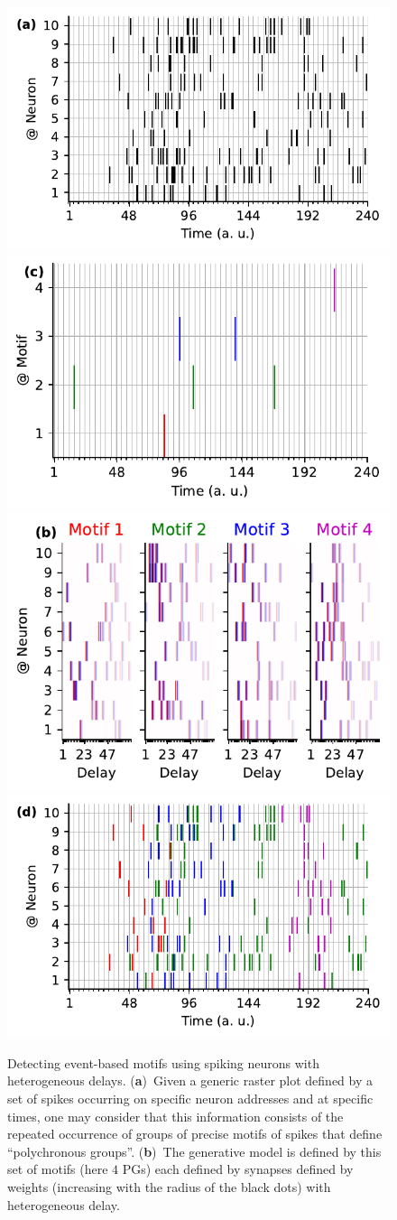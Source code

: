 \documentclass[brainsci, %
               review,accept,pdftex,moreauthors
               ]{Definitions/mdpi}
\begin{document}
\begin{figure}[H]%
    \includegraphics[width=0.490\linewidth]{figures/THC_1a_k.pdf}
    \includegraphics[width=0.490\linewidth]{figures/THC_1c.pdf}
    \includegraphics[width=0.490\linewidth]{figures/THC_1b.pdf}
    \includegraphics[width=0.490\linewidth]{figures/THC_1a.pdf}
      \caption{
        Detecting event-based motifs using spiking neurons with heterogeneous delays.
      { (\textbf{a})}~Given a generic raster plot defined by a set of spikes occurring on specific neuron addresses and at specific times, one may consider that this information consists of the repeated occurrence of groups of precise motifs of spikes that define ``polychronous groups''. 
      { (\textbf{b})}~The generative model is defined by this set of motifs (here $4$ PGs) each defined by  synapses defined by weights (increasing with the radius of the black dots) with heterogeneous delay. 
}
\end{figure}
\end{document}
